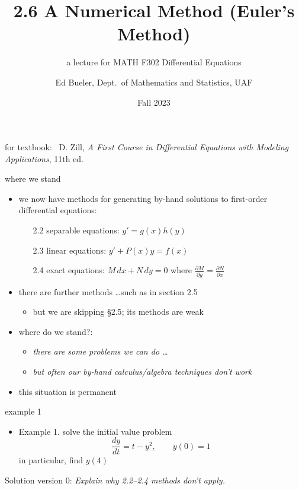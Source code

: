 \documentclass[colorlinks]{beamer}
\title{2.6 A Numerical Method (Euler's Method)}
\subtitle{a lecture for MATH F302 Differential Equations}
\author{Ed Bueler, Dept.~of Mathematics and Statistics, UAF}
\date{Fall 2023}
\begin{document}


\begin{frame}
\titlepage

\centerline{\tiny for textbook: \, D. Zill, \emph{A First Course in Differential Equations with Modeling Applications}, 11th ed.}
\end{frame}


\begin{frame}{where we stand}

\begin{itemize}
\item we now have methods for generating by-hand solutions to first-order differential equations:
    \begin{itemize}
    \item[2.2] separable equations: $y'=g(x)h(y)$
    \item[2.3] linear equations: $y'+P(x)y=f(x)$
    \item[2.4] exact equations: $M\,dx + N\,dy=0$ where $\frac{\partial M}{\partial y} = \frac{\partial N}{\partial x}$
    \end{itemize}
\item there are further methods \dots such as in section 2.5
    \begin{itemize}
    \item but \alert{we are skipping \S 2.5}; its methods are weak
    \end{itemize}

\bigskip
\item where do we stand?:
    \begin{itemize}
    \item \emph{there are some problems we can do \dots}
    \item \emph{but often our by-hand calculus/algebra techniques \alert{don't} work}
    \end{itemize}
\item this situation is permanent
\end{itemize}
\end{frame}


\begin{frame}{example 1}

\begin{itemize}
\item Example 1.  solve the initial value problem
    $$\frac{dy}{dt} = t-y^2, \qquad y(0)=1$$
in particular, find $y(4)$
\end{itemize}

\medskip
Solution version 0: \emph{Explain why 2.2--2.4 methods don't apply.}

\vspace{50mm}
\end{frame}
\end{document}
